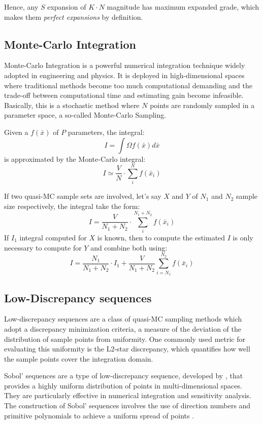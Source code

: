 \documentclass[12pt]{extarticle}
\begin{document}
Hence, any $S$ expansion of $K \cdot N$ magnitude has maximum expanded grade, which makes them \textit{perfect expansions} by definition.

\subsection{Monte-Carlo Integration}
\label{appendix:montecarlo_integration}
Monte-Carlo Integration is a powerful numerical integration technique widely adopted in engineering and physics. It is deployed in high-dimensional spaces where traditional methods become too much computational demanding and the trade-off between computational time and estimating gain become infeasible. Basically, this is a stochastic method where $N$ points are randomly sampled in a parameter space, a so-called Monte-Carlo Sampling. 

Given a $f(\bar{x})$ of $P$ parameters, the integral:
\begin{equation*}
I = \int{\Omega}f(\bar{x})d\bar{x}
\end{equation*}
is approximated by the Monte-Carlo integral:
\begin{equation*}
I \simeq \frac{V}{N} \cdot \sum^N_i{f(\bar{x}_i)}
\end{equation*}

If two quasi-MC sample sets are involved, let's say $X$ and $Y$ of $N_1$ and $N_2$ sample size respectively, the integral take the form:
\begin{equation*}
I = \frac{V}{N_1 + N_2} \cdot \sum^{N_1 + N_2}_i{f(\bar{x}_i)}
\end{equation*}
If $I_1$ integral computed for $X$ is known, then to compute the estimated $I$ is only necessary to compute for $Y$ and combine both using:
\begin{equation}
\label{eq:mc_next_step}
I = \frac{N_1}{N_1 + N_2} \cdot I_1 + \frac{V}{N_1 + N_2}\sum^{N_2}_{i=N_1}{f(\bar{x}_i)}
\end{equation}

\subsection{Low-Discrepancy sequences}
\label{appendix:low_discrepancy}
Low-discrepancy sequences are a class of quasi-MC sampling methods which adopt a discrepancy minimization criteria, a measure of the deviation of the distribution of sample points from uniformity. One commonly used metric for evaluating this uniformity is the L2-star discrepancy, which quantifies how well the sample points cover the integration domain.

Sobol’ sequences are a type of low-discrepancy sequence, developed by , that provides a highly uniform distribution of points in multi-dimensional spaces. They are particularly effective in numerical integration and sensitivity analysis. The construction of Sobol’ sequences involves the use of direction numbers and primitive polynomials to achieve a uniform spread of points . 


\pagebreak
\printbibliography
\end{document}
